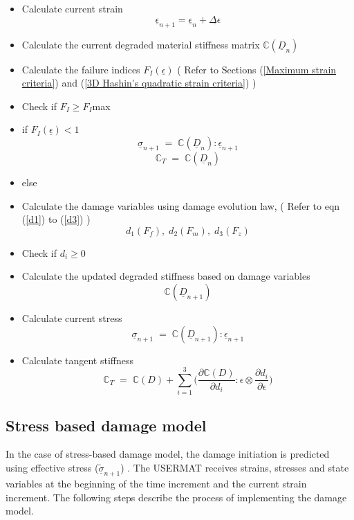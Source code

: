 \documentclass[12pt,openright,twoside]{report}
\begin{document}
\begin{itemize}
\item Calculate current strain \textbf{$$ \underline{\epsilon}_{n+1} = \underline{\epsilon}_{n} + \underline{\Delta \epsilon} $$}
\item Calculate the current degraded material stiffness matrix  \textbf{$\mathbb{C}(\underline{D}_{n})$}
\item Calculate the failure indices \textbf{$F_{I}(\underline{\epsilon})$} \;\; ( Refer to Sections (\ref{Maximum strain criteria}) and (\ref{3D Hashin's quadratic strain criteria}) )
\item[] Check if $F_{I} \geq F_{I}$max
\item if \textbf{$F_{I}(\underline{\epsilon})<1$} \textbf{$$\underline{\sigma}_{n+1} \; = \; \mathbb{C}(\underline{D}_{n}) :  \underline{\epsilon}_{n+1} $$} \textbf{$$\mathbb{C}_{T} \; = \; \mathbb{C}(\underline{D}_{n})$$}
\item else
\item[]  Calculate the damage variables using damage evolution law, \;\; ( Refer to eqn (\ref{d1}) to (\ref{d3}) ) \textbf{$$d_{1}(F_{f}),\;d_{2}(F_{m}),\;d_{3}(F_{z})$$}
\item[]  Check if $d_{i} \geq 0 $ 
\item[]  Calculate the updated degraded stiffness based on damage variables \textbf{$$\mathbb{C}(\underline{D}_{n+1})$$}
\item[]  Calculate current stress  \textbf{$$\underline{\sigma}_{n+1} \; = \; \mathbb{C}(\underline{D}_{n+1}) :  \underline{\epsilon}_{n+1} $$}
\item[] Calculate tangent stiffness \textbf{$$\mathbb{C}_{T}  \; = \;\mathbb{C}(D) + \sum_{i = 1}^{3} \Big( \frac{\partial \mathbb{C}(D) }{\partial d_{i}} : \epsilon \otimes \frac{\partial d_{i}}{\partial \epsilon }\Big)$$}
	
\end{itemize} 


\subsection{Stress based damage model}
\indent\indent\indent  In the case of stress-based damage model, the damage initiation is predicted using effective stress ($\underline{\tilde{\sigma}}_{n+1}$) \citep{jiang2018evaluations}.  The USERMAT receives strains, stresses and state variables at the beginning of the time increment and the current strain increment. The following steps describe the process of implementing the damage model.
\end{document}

